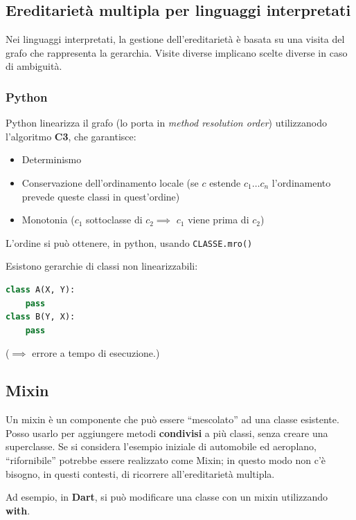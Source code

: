 \documentclass[a4paper,10pt]{article}
\begin{document}
\subsection{Ereditarietà multipla per linguaggi interpretati}
Nei linguaggi interpretati, la gestione dell'ereditarietà è basata su una visita del grafo che rappresenta la gerarchia. Visite diverse implicano scelte diverse in caso di ambiguità.

\subsubsection{Python}
Python linearizza il grafo (lo porta in \textit{method resolution order}) utilizzanodo l'algoritmo \textbf{C3}, che garantisce:

\begin{itemize}
 \item Determinismo
 \item Conservazione dell'ordinamento locale (se $c$ estende $c_1 \hdots c_n$ l'ordinamento prevede queste classi in quest'ordine)
 \item Monotonia ($c_1$ sottoclasse di $c_2 \implies $ $c_1$ viene prima di $c_2$)
\end{itemize}

L'ordine si può ottenere, in python, usando \texttt{CLASSE.mro()}\smallskip

Esistono gerarchie di classi non linearizzabili:

\begin{lstlisting}[language=python]
 class A(X, Y):
    pass
class B(Y, X):
    pass
\end{lstlisting}

($\implies$ errore a tempo di esecuzione.)


\subsection{Mixin}
Un mixin è un componente che può essere ``mescolato'' ad una classe esistente. Posso usarlo per aggiungere metodi \textbf{condivisi} a più classi, senza creare una superclasse. Se si considera l'esempio iniziale di automobile ed aeroplano, ``rifornibile'' potrebbe essere realizzato come Mixin; in questo modo non c'è bisogno, in questi contesti, di ricorrere all'ereditarietà multipla. \smallskip

Ad esempio, in \textbf{Dart}, si può modificare una classe con un mixin utilizzando \textbf{with}.
\end{document}
